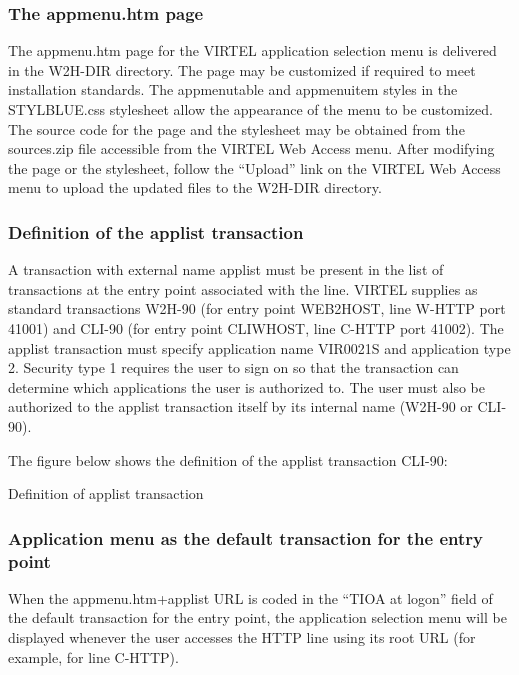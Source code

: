 \documentclass[letterpaper,10pt,english]{sphinxmanual}
\begin{document}
\subsubsection{The appmenu.htm page}
\label{\detokenize{User_Guide:the-appmenu-htm-page}}
The appmenu.htm page for the VIRTEL application selection menu is delivered in the W2H-DIR directory. The page may be customized if required to meet installation standards. The appmenutable and appmenuitem styles in the STYLBLUE.css stylesheet allow the appearance of the menu to be customized. The source code for the page and the stylesheet may be obtained from the sources.zip file accessible from the VIRTEL Web Access menu. After modifying the page or the stylesheet, follow the “Upload” link on the VIRTEL Web Access menu to upload the updated files to the W2H-DIR directory.


\subsubsection{Definition of the applist transaction}
\label{\detokenize{User_Guide:definition-of-the-applist-transaction}}
A transaction with external name applist must be present in the list of transactions at the entry point associated with
the line. VIRTEL supplies as standard transactions W2H-90 (for entry point WEB2HOST, line W-HTTP port 41001) and
CLI-90 (for entry point CLIWHOST, line C-HTTP port 41002). The applist transaction must specify application name
VIR0021S and application type 2. Security type 1 requires the user to sign on so that the transaction can determine
which applications the user is authorized to. The user must also be authorized to the applist transaction itself by its
internal name (W2H-90 or CLI-90).

The figure below shows the definition of the applist transaction CLI-90:

Definition of applist transaction


\subsubsection{Application menu as the default transaction for the entry point}
\label{\detokenize{User_Guide:application-menu-as-the-default-transaction-for-the-entry-point}}
When the appmenu.htm+applist URL is coded in the “TIOA at logon” field of the default transaction for the entry
point, the application selection menu will be displayed whenever the user accesses the HTTP line using its root URL
(for example,  for line C-HTTP).
\end{document}
